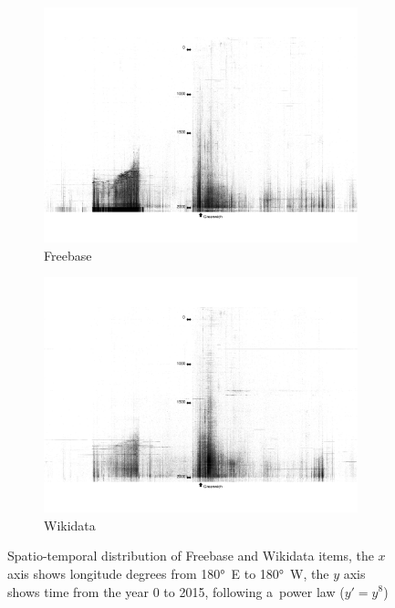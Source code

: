 \documentclass{sig-alternate}
\begin{document}
\begin{figure}[!htbp]
    \centering
    \begin{subfigure}[b]{0.45\textwidth}
        \includegraphics[width=\textwidth]{img/freebase-time-space.png}
        \caption{Freebase}
        \label{fig:freebase}
    \end{subfigure}
    \begin{subfigure}[b]{0.45\textwidth}
        \includegraphics[width=\textwidth]{img/wikidata-time-space.png}
        \caption{Wikidata}
        \label{fig:wikidata}
    \end{subfigure}
    \caption{Spatio-temporal distribution of Freebase and Wikidata items,
      the $x$ axis shows longitude degrees from 180°~E to 180°~W, the $y$ axis shows time from the year 0 to 2015, following a~power law ($y' = y^8$)}
    \label{fig:time-space}
\end{figure}
\end{document}
